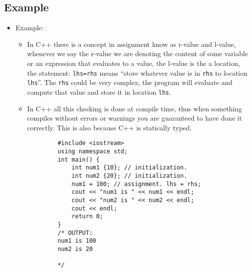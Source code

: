 \subsection{Example}
\begin{itemize}
    \item Example: 
        \begin{itemize}
            \item In C++ there is a concept in assignment know as r-value and l-value, whenever we say the r-value we are denoting the content of some variable or an expression that evaluates to a value, the l-value is the a location, the statement: \texttt{lhs=rhs} means ``store whatever value is in \verb|rhs| to location \verb|lhs|''. The \verb|rhs| could be very complex, the program will evaluate and compute that value and store it in location \verb|lhs|.
            \item In C++ all this checking is done at compile time, thus when something compiles without errors or warnings you are guaranteed to have done it correctly. This is also because C++ is statically typed.
        \end{itemize}
        \begin{verbatim}
            #include <iostream>
            using namespace std;
            int main() {
                int num1 {10}; // initialization.
                int num2 {20}; // initialization.
                num1 = 100; // assignment. lhs = rhs;
                cout << "num1 is " << num1 << endl;
                cout << "num2 is " << num2 << endl;
                cout << endl;
                return 0;
            } 
            /* OUTPUT:
            num1 is 100
            num2 is 20

            */
        \end{verbatim}
    

\end{itemize}
